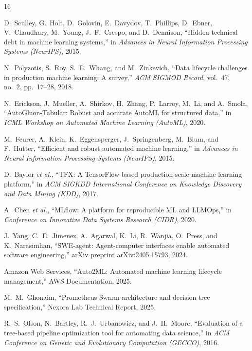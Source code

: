 \documentclass[conference]{IEEEtran}
\begin{document}
\begin{thebibliography}{16}

D.~Sculley, G.~Holt, D.~Golovin, E.~Davydov, T.~Phillips, D.~Ebner, V.~Chaudhary,
M.~Young, J.~F.~Crespo, and D.~Dennison, ``Hidden technical debt in machine learning
systems,'' in \emph{Advances in Neural Information Processing Systems (NeurIPS)}, 2015.

N.~Polyzotis, S.~Roy, S.~E.~Whang, and M.~Zinkevich, ``Data lifecycle challenges in
production machine learning: A survey,'' \emph{ACM SIGMOD Record}, vol.~47, no.~2,
pp.~17--28, 2018.

N.~Erickson, J.~Mueller, A.~Shirkov, H.~Zhang, P.~Larroy, M.~Li, and A.~Smola,
``AutoGluon-Tabular: Robust and accurate AutoML for structured data,'' in \emph{ICML
Workshop on Automated Machine Learning (AutoML)}, 2020.

M.~Feurer, A.~Klein, K.~Eggensperger, J.~Springenberg, M.~Blum, and F.~Hutter,
``Efficient and robust automated machine learning,'' in \emph{Advances in Neural
Information Processing Systems (NeurIPS)}, 2015.

D.~Baylor \emph{et al.}, ``TFX: A TensorFlow-based production-scale machine learning
platform,'' in \emph{ACM SIGKDD International Conference on Knowledge Discovery and Data
Mining (KDD)}, 2017.

A.~Chen \emph{et al.}, ``MLflow: A platform for reproducible ML and LLMOps,'' in
\emph{Conference on Innovative Data Systems Research (CIDR)}, 2020.

J.~Yang, C.~E.~Jimenez, A.~Agarwal, K.~Li, R.~Wanjia, O.~Press, and K.~Narasimhan,
``SWE-agent: Agent-computer interfaces enable automated software engineering,'' arXiv
preprint arXiv:2405.15793, 2024.

Amazon Web Services, ``Auto2ML: Automated machine learning lifecycle management,''
AWS Documentation, 2025.

M.~M.~Ghonaim, ``Prometheus Swarm architecture and decision tree specification,''
Nexora Lab Technical Report, 2025.

R.~S.~Olson, N.~Bartley, R.~J.~Urbanowicz, and J.~H.~Moore, ``Evaluation of a
tree-based pipeline optimization tool for automating data science,'' in \emph{ACM
Conference on Genetic and Evolutionary Computation (GECCO)}, 2016.


\end{thebibliography}
\end{document}
